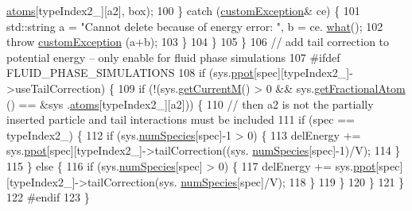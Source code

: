 \begin{DoxyCode}
      \hyperlink{classsim_system_a90421b19082f7fb8fc23b7264b1161e4}{atoms}[typeIndex2\_][a2], box);
100                 \} \textcolor{keywordflow}{catch} (\hyperlink{classcustom_exception}{customException}& ce) \{
101                     std::string a = \textcolor{stringliteral}{"Cannot delete because of energy error: "}, b = ce.
      \hyperlink{classcustom_exception_aeb6ab5848b038adfc68fde86a512f691}{what}();
102                     \textcolor{keywordflow}{throw} \hyperlink{classcustom_exception}{customException} (a+b);
103                 \}
104                 \}
105             \}
106             \textcolor{comment}{// add tail correction to potential energy -- only enable for fluid phase simulations}
107 \textcolor{preprocessor}{#ifdef FLUID\_PHASE\_SIMULATIONS}
108 \textcolor{preprocessor}{}            \textcolor{keywordflow}{if} (sys.\hyperlink{classsim_system_ad2e290b5963f132e6a3a56cee35c8e9f}{ppot}[spec][typeIndex2\_]->useTailCorrection) \{
109                 \textcolor{keywordflow}{if} (!(sys.\hyperlink{classsim_system_a299fe4372e610b554eaaf5f5957b2dbc}{getCurrentM}() > 0 && sys.\hyperlink{classsim_system_a2ab77377c60e0e3109a6e875690b0ab7}{getFractionalAtom} () == &sys
      .\hyperlink{classsim_system_a90421b19082f7fb8fc23b7264b1161e4}{atoms}[typeIndex2\_][a2])) \{
110                     \textcolor{comment}{// then a2 is not the partially inserted particle and tail interactions must be
       included}
111                     \textcolor{keywordflow}{if} (spec == typeIndex2\_) \{
112                                 \textcolor{keywordflow}{if} (sys.\hyperlink{classsim_system_a9eea865e6dc1cff377b1e79c4d9c23f0}{numSpecies}[spec]-1 > 0) \{
113                                     delEnergy += sys.\hyperlink{classsim_system_ad2e290b5963f132e6a3a56cee35c8e9f}{ppot}[spec][typeIndex2\_]->tailCorrection((sys.
      \hyperlink{classsim_system_a9eea865e6dc1cff377b1e79c4d9c23f0}{numSpecies}[spec]-1)/V);
114                                 \}
115                     \} \textcolor{keywordflow}{else} \{
116                                 \textcolor{keywordflow}{if} (sys.\hyperlink{classsim_system_a9eea865e6dc1cff377b1e79c4d9c23f0}{numSpecies}[spec] > 0) \{
117                                     delEnergy += sys.\hyperlink{classsim_system_ad2e290b5963f132e6a3a56cee35c8e9f}{ppot}[spec][typeIndex2\_]->tailCorrection(sys.
      \hyperlink{classsim_system_a9eea865e6dc1cff377b1e79c4d9c23f0}{numSpecies}[spec]/V);
118                                 \}
119                     \}
120                 \}
121             \}
122 \textcolor{preprocessor}{#endif}
123 \textcolor{preprocessor}{}        \}

\end{DoxyCode}
